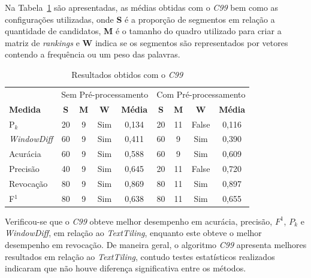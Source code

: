 


Na Tabela~\ref{tab:resultadosc99} são apresentadas, as médias obtidas com o \textit{C99} bem como as configurações utilizadas, onde \textbf{S} é a proporção de segmentos em relação a quantidade de candidatos, \textbf{M} é o tamanho do quadro utilizado para criar a matriz de \textit{rankings} e \textbf{W} indica se os segmentos são representados por vetores contendo a frequência ou um peso das palavras.


\begin{table}[!h]
	\centering
	\begin{tabular}{|l||c|c|c|c||c|c|c|c|} \hline

		& \multicolumn{4}{c||}{Sem Pré-processamento} 
		& \multicolumn{4}{c|}{Com Pré-processamento}\\			

		\textbf{Medida} & 
		\textbf{S} & 
		\textbf{M} & 
		\textbf{W} & 
		\textbf{Média} &
		\textbf{S} & 
		\textbf{M} & 
		\textbf{W} & 
		\textbf{Média} \\	\hline

		P$_k$				& 20 & 9 & Sim & 0,134& 20 & 11 & False	& 0,116 \\ \hline  
		\textit{WindowDiff}	& 60 & 9 & Sim & 0,411& 60 &  9 & Sim 	& 0,390 \\ \hline  
		Acurácia			& 60 & 9 & Sim & 0,588& 60 &  9 & Sim 	& 0,609 \\ \hline  
		Precisão			& 40 & 9 & Sim & 0,645& 20 & 11 & False	& 0,720 \\ \hline  
		Revocação			& 80 & 9 & Sim & 0,869& 80 & 11 & Sim 	& 0,897 \\ \hline  
		F$^1$				& 80 & 9 & Sim & 0,638& 80 & 11 & Sim 	& 0,655 \\ \hline  

	\end{tabular}
	\caption{Resultados obtidos com o \textit{C99}}
	\label{tab:resultadosc99}
\end{table}



Verificou-se que o \textit{C99} obteve melhor desempenho em acurácia, precisão, $F^1$, $P_k$ e \textit{WindowDiff}, em relação ao \textit{TextTiling}, enquanto este obteve o melhor desempenho em revocação. De maneira geral, o algoritmo \textit{C99} apresenta melhores resultados em relação ao \textit{TextTiling}, contudo testes estatísticos realizados indicaram que não houve diferença significativa entre os métodos. 



